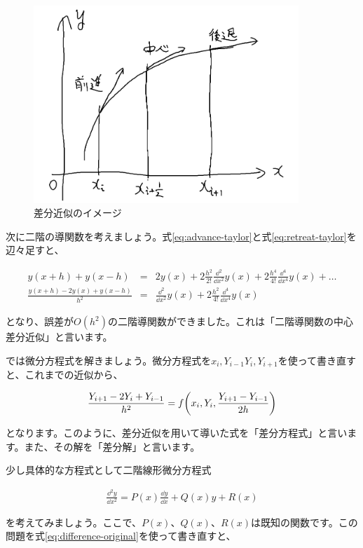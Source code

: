 \begin{figure}[ht!]
  \centering
  \includegraphics[width=10cm]{img/4-difference.png}
  \caption{差分近似のイメージ}
  \label{fig:4-difference}
\end{figure}

次に二階の導関数を考えましょう。式\ref{eq:advance-taylor}と式\ref{eq:retreat-taylor}を辺々足すと、

\begin{eqnarray}
    y(x+h)+y(x-h)&=&2y(x)+2\frac{h^2}{2!}\frac{\dd^2}{\dd x^2}y(x)+2\frac{h^4}{4!}\frac{\dd^4}{\dd x^4}y(x)+\dots \\
    \frac{y(x+h)-2y(x)+y(x-h)}{h^2}&=&\frac{\dd^2}{\dd x^2}y(x)+2\frac{h^2}{4!}\frac{\dd^4}{\dd x^4}y(x)
\end{eqnarray}

\noindent
となり、誤差が$O(h^2)$の二階導関数ができました。これは「二階導関数の中心差分近似」と言います。

では微分方程式を解きましょう。微分方程式を$x_i,Y_{i-1}Y_i,Y_{i+1}$を使って書き直すと、これまでの近似から、

\begin{eqnarray}
    \frac{Y_{i+1}-2Y_i+Y_{i-1}}{h^2}=f\pqty{x_i,Y_i,\frac{Y_{i+1}-Y_{i-1}}{2h}}
    \label{eq:difference-original}
\end{eqnarray}

\noindent
となります。このように、差分近似を用いて導いた式を「差分方程式」と言います。また、その解を「差分解」と言います。

少し具体的な方程式として二階線形微分方程式

\begin{eqnarray}
    \frac{\dd^2 y}{\dd x^2}=P(x)\frac{\dd y}{\dd x}+Q(x)y+R(x)
\end{eqnarray}

\noindent
を考えてみましょう。ここで、$P(x)$、$Q(x)$、$R(x)$は既知の関数です。この問題を式\ref{eq:difference-original}を使って書き直すと、

